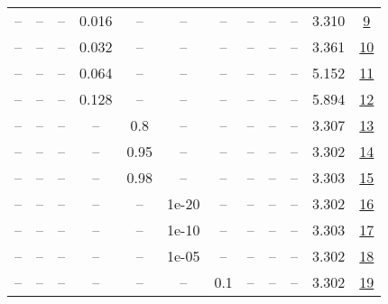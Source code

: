 \begin{table}[H]
\begin{tabular}{cccccccccccc}
-- & -- & -- & 0.016 & -- & -- & -- & -- & -- & -- & 3.310 & \href{https://wandb.ai/stanford-mercury/optimizer-scaling/runs/sweep-130m-10B-scion7f272clr0.016-wd0.1-minlr0-warmup0-b10.98-gn-dfad11}{9} \\
-- & -- & -- & 0.032 & -- & -- & -- & -- & -- & -- & 3.361 & \href{https://wandb.ai/stanford-mercury/optimizer-scaling/runs/sweep-130m-10B-scion2cfd93lr0.032-wd0.1-minlr0-warmup0-b10.98-gn-1524ed}{10} \\
-- & -- & -- & 0.064 & -- & -- & -- & -- & -- & -- & 5.152 & \href{https://wandb.ai/stanford-mercury/optimizer-scaling/runs/sweep-130m-10B-scion39d76blr0.064-wd0.1-minlr0-warmup0-b10.98-gn-b75bde}{11} \\
-- & -- & -- & 0.128 & -- & -- & -- & -- & -- & -- & 5.894 & \href{https://wandb.ai/stanford-mercury/optimizer-scaling/runs/sweep-130m-10B-scionadd481lr0.128-wd0.1-minlr0-warmup0-b10.98-gn-7dc1e1}{12} \\
-- & -- & -- & -- & 0.8 & -- & -- & -- & -- & -- & 3.307 & \href{https://wandb.ai/stanford-mercury/optimizer-scaling/runs/sweep-130m-10B-scionb9d13elr0.008-wd0.1-minlr0-warmup0-b10.98-gn-60ca44}{13} \\
-- & -- & -- & -- & 0.95 & -- & -- & -- & -- & -- & 3.302 & \href{https://wandb.ai/stanford-mercury/optimizer-scaling/runs/sweep-130m-10B-scion79d871lr0.008-wd0.1-minlr0-warmup0-b10.98-gn-d7d690}{14} \\
-- & -- & -- & -- & 0.98 & -- & -- & -- & -- & -- & 3.303 & \href{https://wandb.ai/stanford-mercury/optimizer-scaling/runs/sweep-130m-10B-scion7c7f25lr0.008-wd0.1-minlr0-warmup0-b10.98-gn-78ad4e}{15} \\
-- & -- & -- & -- & -- & 1e-20 & -- & -- & -- & -- & 3.302 & \href{https://wandb.ai/stanford-mercury/optimizer-scaling/runs/sweep-130m-10B-scion31bca7lr0.008-wd0.1-minlr0-warmup0-b10.98-gn-c73231}{16} \\
-- & -- & -- & -- & -- & 1e-10 & -- & -- & -- & -- & 3.303 & \href{https://wandb.ai/stanford-mercury/optimizer-scaling/runs/sweep-130m-10B-scion95d589lr0.008-wd0.1-minlr0-warmup0-b10.98-gn-16884a}{17} \\
-- & -- & -- & -- & -- & 1e-05 & -- & -- & -- & -- & 3.302 & \href{https://wandb.ai/stanford-mercury/optimizer-scaling/runs/sweep-130m-10B-scion8d67e8lr0.008-wd0.1-minlr0-warmup0-b10.98-gn-f7a59e}{18} \\
-- & -- & -- & -- & -- & -- & 0.1 & -- & -- & -- & 3.302 & \href{https://wandb.ai/stanford-mercury/optimizer-scaling/runs/sweep-130m-10B-scion9d476clr0.008-wd0.1-minlr0-warmup0-b10.98-gn-6116a3}{19} \\

\end{tabular}
\end{table}
